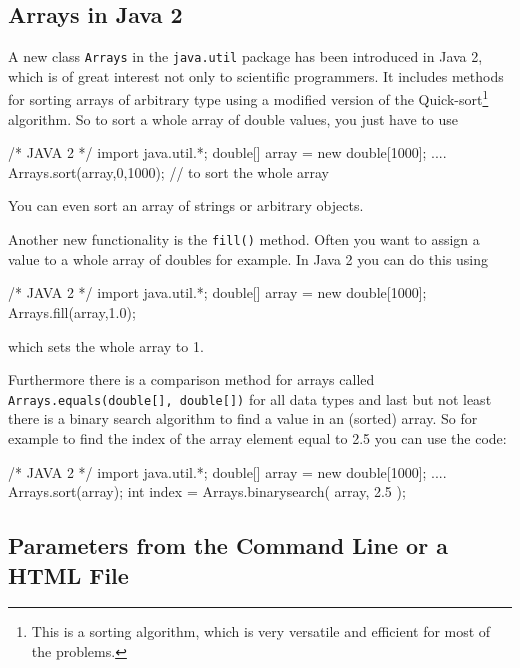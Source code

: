 \subsection{Arrays in Java 2}
A new class \verb|Arrays| in the \verb|java.util| package has been
introduced in Java 2, which is of great interest not only to scientific
programmers. It includes methods for sorting arrays of arbitrary
type using a modified version of the Quick-sort\footnote{This is
a sorting algorithm, which is very versatile and efficient for
most of the problems.} algorithm. So to sort a whole array 
of double values, you just have to use
\begin{sverbatim}
  /* JAVA 2 */
  import java.util.*;
  double[] array = new double[1000];
  ....
  Arrays.sort(array,0,1000); // to sort the whole array
\end{sverbatim}
You can even sort an array of strings or arbitrary objects.

Another new functionality is the \verb|fill()| method. Often you
want to assign a value to a whole array of doubles for example.
In Java 2 you can do this using
\begin{sverbatim}
  /* JAVA 2 */
  import java.util.*;
  double[] array = new double[1000];
  Arrays.fill(array,1.0);
\end{sverbatim}
which sets the whole array to 1.

Furthermore there is a comparison method for arrays called
\verb|Arrays.equals(double[], double[])| for all data types and
last but not least there is a binary search algorithm to
find a value in an (sorted) array. So for example to find the index of the
array element equal to 2.5 you can use the code:
\begin{sverbatim}
  /* JAVA 2 */
  import java.util.*;
  double[] array = new double[1000];
  ....
  Arrays.sort(array);
  int index = Arrays.binarysearch( array, 2.5 );
\end{sverbatim}

\subsection{Parameters from the Command Line or a HTML File}
\label{sec:Parameter}


